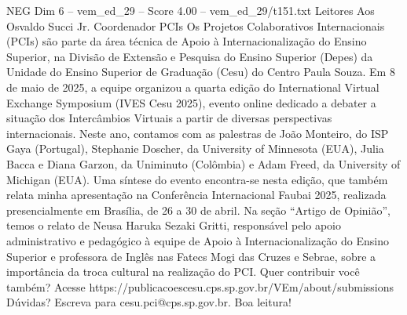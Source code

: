 \begin{textsample}{NEG Dim 6 – vem\_ed\_29 – Score 4.00 – vem\_ed\_29/t151.txt}  \label{ex:f6_neg_159}
Leitores Aos Osvaldo Succi Jr.
Coordenador PCIs Os Projetos Colaborativos Internacionais (PCIs) são parte da área técnica de Apoio à Internacionalização do Ensino Superior, na Divisão de Extensão e Pesquisa do Ensino Superior (Depes) da Unidade do Ensino Superior de Graduação (Cesu) do Centro Paula Souza.
Em 8 de maio de 2025, a equipe organizou a quarta edição do International Virtual Exchange Symposium (IVES Cesu 2025), evento online dedicado a debater a situação dos Intercâmbios Virtuais a partir de diversas perspectivas internacionais.
Neste ano, contamos com as palestras de João Monteiro, do ISP Gaya (Portugal), Stephanie Doscher, da University of Minnesota (EUA), Julia Bacca e Diana Garzon, da Uniminuto (Colômbia) e Adam Freed, da University of Michigan (EUA).
Uma síntese do evento encontra-se nesta edição, que também relata minha apresentação na Conferência Internacional Faubai 2025, realizada presencialmente em Brasília, de 26 a 30 de abril.
Na seção “Artigo de Opinião”, temos o relato de Neusa Haruka Sezaki Gritti, responsável pelo apoio administrativo e pedagógico à equipe de Apoio à Internacionalização do Ensino Superior e professora de Inglês nas Fatecs Mogi das Cruzes e Sebrae, sobre a importância da troca cultural na realização do PCI.
Quer contribuir você também?
Acesse https://publicacoescesu.cps.sp.gov.br/VEm/about/submissions Dúvidas?
Escreva para cesu.pci@cps.sp.gov.br.
Boa leitura!

\end{textsample}
